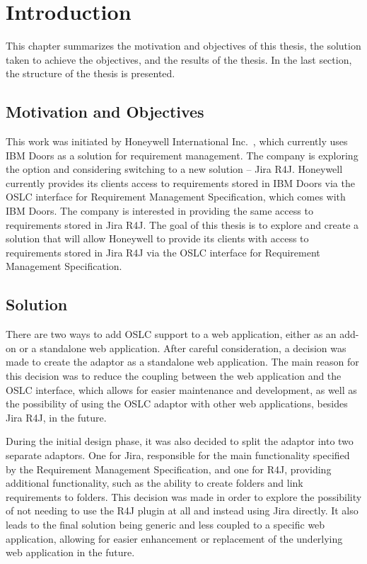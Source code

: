 
% 

\chapter{Introduction}
This chapter summarizes the motivation and objectives of this thesis, the solution taken to achieve the objectives, and the results of the thesis. In the last section, the structure of the thesis is presented.

\section{Motivation and Objectives}
This work was initiated by Honeywell International Inc. \cite{honeywell}, which currently uses IBM Doors as a solution for requirement management. The company is exploring the option and considering switching to a new solution -- Jira R4J. Honeywell currently provides its clients access to requirements stored in IBM Doors via the OSLC interface for Requirement Management Specification, which comes with IBM Doors. The company is interested in providing the same access to requirements stored in Jira R4J. The goal of this thesis is to explore and create a solution that will allow Honeywell to provide its clients with access to requirements stored in Jira R4J via the OSLC interface for Requirement Management Specification.

\section{Solution}
There are two ways to add OSLC support to a web application, either as an add-on or a standalone web application. After careful consideration, a decision was made to create the adaptor as a standalone web application. The main reason for this decision was to reduce the coupling between the web application and the OSLC interface, which allows for easier maintenance and development, as well as the possibility of using the OSLC adaptor with other web applications, besides Jira R4J, in the future. 

During the initial design phase, it was also decided to split the adaptor into two separate adaptors. One for Jira, responsible for the main functionality specified by the Requirement Management Specification, and one for R4J, providing additional functionality, such as the ability to create folders and link requirements to folders. This decision was made in order to explore the possibility of not needing to use the R4J plugin at all and instead using Jira directly. It also leads to the final solution being generic and less coupled to a specific web application, allowing for easier enhancement or replacement of the underlying web application in the future.

